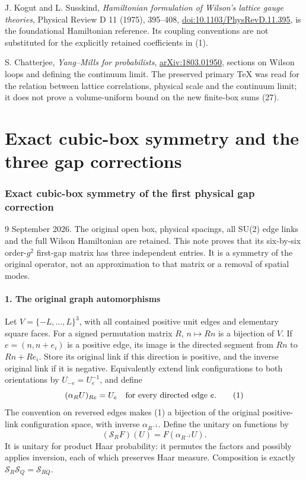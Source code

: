\documentclass[
  11pt,
]{article}
\begin{document}
J. Kogut and L. Susskind, \emph{Hamiltonian formulation of Wilson's
lattice gauge theories}, Physical Review D 11 (1975), 395--408,
\href{https://doi.org/10.1103/PhysRevD.11.395}{doi:10.1103/PhysRevD.11.395},
is the foundational Hamiltonian reference. Its coupling conventions are
not substituted for the explicitly retained coefficients in (1).

S. Chatterjee, \emph{Yang--Mills for probabilists},
\href{https://arxiv.org/abs/1803.01950}{arXiv:1803.01950}, sections on
Wilson loops and defining the continuum limit. The preserved primary TeX
was read for the relation between lattice correlations, physical scale
and the continuum limit; it does not prove a volume-uniform bound on the
new finite-box sums (27).

\clearpage
\part{Exact cubic-box symmetry and the three gap corrections}
\section{Exact cubic-box symmetry of the first physical gap
correction}\label{weak-coupling-part-16-exact-cubic-box-symmetry-of-the-first-physical-gap-correction}

9 September 2026. The original open box, physical spacings, all SU(2)
edge links and the full Wilson Hamiltonian are retained. This note
proves that its six-by-six order-\(g^2\) first-gap matrix has three
independent entries. It is a symmetry of the original operator, not an
approximation to that matrix or a removal of spatial modes.

\subsection{1. The original graph
automorphisms}\label{weak-coupling-part-16-the-original-graph-automorphisms}

Let \(V=\{-L,\ldots,L\}^3\), with all contained positive unit edges and
elementary square faces. For a signed permutation matrix \(R\),
\(n\mapsto Rn\) is a bijection of \(V\). If \(e=(n,n+e_i)\) is a
positive edge, its image is the directed segment from \(Rn\) to
\(Rn+Re_i\). Store its original link if this direction is positive, and
the inverse original link if it is negative. Equivalently extend link
configurations to both orientations by \(U_{-e}=U_e^{-1}\), and define
\[
 (\alpha_R U)_{Re}=U_e
 \quad\hbox{for every directed edge }e .
 \tag{1}
\] The convention on reversed edges makes (1) a bijection of the
original positive-link configuration space, with inverse
\(\alpha_{R^{-1}}\). Define the unitary on functions by \[
 (\mathscr S_R F)(U)=F(\alpha_{R^{-1}}U).
 \tag{2}
\] It is unitary for product Haar probability: it permutes the factors
and possibly applies inversion, each of which preserves Haar measure.
Composition is exactly \(\mathscr S_R\mathscr S_Q=\mathscr S_{RQ}\).
\end{document}
